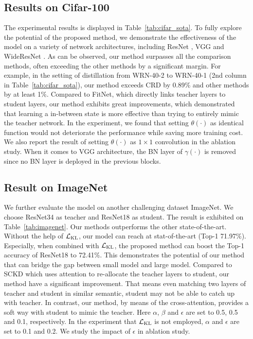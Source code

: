 \documentclass[10pt,twocolumn,letterpaper]{article}
\begin{document}
\subsection{Results on Cifar-100}
The experimental results is displayed in Table~\ref{tab:cifar_sota}. To fully explore the potential of the proposed method, we demonstrate the effectiveness of the model on a variety of network architectures, including ResNet \cite{He2016DeepRL}, VGG \cite{simonyan2014very} and WideResNet \cite{Zagoruyko2016WideRN}. As can be observed, our method surpasses all the comparison methods, often exceeding the other methods by a significant margin. For example, in the setting of distillation from WRN-40-2 to WRN-40-1 (2nd column in Table~\ref{tab:cifar_sota}), our method exceeds CRD by 0.89\% and other methods by at least 1\%. Compared to FitNet, which directly links teacher layers to student layers, our method exhibits great improvements, which demonstrated that learning a in-between state is more effective than trying to entirely mimic the teacher network. In the experiment, we found that setting $\theta(\cdot)$ as identical function would not deteriorate the performance while saving more training cost. We also report the result of setting $\theta(\cdot)$ as $1\times1$ convolution in the ablation study. When it comes to VGG architecture, the BN layer of $\gamma(\cdot)$ is removed since no BN layer is deployed in the previous blocks.

\subsection{Result on ImageNet}
We further evaluate the model on another challenging dataset ImageNet. We choose ResNet34 as teacher and ResNet18 as student. The result is exhibited on Table~\ref{tab:imagenet}. Our methods outperforms the other state-of-the-art. Without the help of $\mathcal{L}_{\rm{KL}}$, our model can reach at stat-of-the-art (Top-1 71.97\%). Especially, when combined with $\mathcal{L}_{\rm{KL}}$, the proposed method can boost the Top-1 accuracy of ResNet18 to 72.41\%. This demonstrates the potential of our method that can bridge the gap between small model and large model. Compared to SCKD which uses attention to re-allocate the teacher layers to student, our method have a significant improvement. That means even matching two layers of teacher and student in similar semantic, student may not be able to catch up with teacher. In contrast, our method, by means of the cross-attention, provides a soft way with student to mimic the teacher.
Here $\alpha$, $\beta$ and $\epsilon$ are set to 0.5, 0.5 and 0.1, respectively. In the experiment that $\mathcal{L}_{\rm{KL}}$ is not employed, $\alpha$ and $\epsilon$ are set to 0.1 and 0.2. We study the impact of $\epsilon$ in ablation study.
\end{document}
